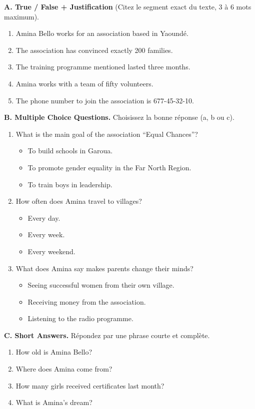 \documentclass[11pt]{article}
\begin{document}
\begin{exercice}
\textbf{A. True / False + Justification} (Citez le segment exact du texte, 3 à 6 mots maximum).
\begin{enumerate}
    \item Amina Bello works for an association based in Yaoundé.
    \item The association has convinced exactly 200 families.
    \item The training programme mentioned lasted three months.
    \item Amina works with a team of fifty volunteers.
    \item The phone number to join the association is 677-45-32-10.
\end{enumerate}

\textbf{B. Multiple Choice Questions.} Choisissez la bonne réponse (a, b ou c).
\begin{enumerate}
    \item What is the main goal of the association “Equal Chances”?
    \begin{itemize}
        \item[a)] To build schools in Garoua.
        \item[b)] To promote gender equality in the Far North Region.
        \item[c)] To train boys in leadership.
    \end{itemize}
    \item How often does Amina travel to villages?
    \begin{itemize}
        \item[a)] Every day.
        \item[b)] Every week.
        \item[c)] Every weekend.
    \end{itemize}
    \item What does Amina say makes parents change their minds?
    \begin{itemize}
        \item[a)] Seeing successful women from their own village.
        \item[b)] Receiving money from the association.
        \item[c)] Listening to the radio programme.
    \end{itemize}
\end{enumerate}

\textbf{C. Short Answers.} Répondez par une phrase courte et complète.
\begin{enumerate}
    \item How old is Amina Bello?
    \item Where does Amina come from?
    \item How many girls received certificates last month?
    \item What is Amina's dream?
\end{enumerate}
\end{exercice}
\end{document}
